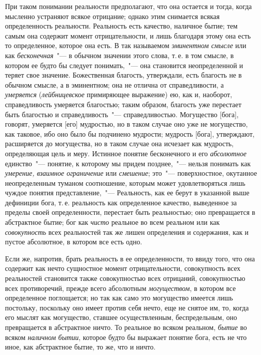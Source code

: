 При таком понимании реальности предполагают, что
она остается и тогда, когда мысленно устраняют всякое
отрицание; однако этим снимается всякая определенность
реальности. Реальность есть качество, наличное
бытие; тем самым она содержит момент отрицательности,
и лишь благодаря этому она есть то определенное, которое
она есть. В так называемом \emph{эминентном смысле}\endnotemark{}
или как \emph{бесконечная}~"--- в обычном значении этого слова,
т.\,е. в том смысле, в котором ее будто бы следует понимать,~"---
она становится неопределенной и теряет свое
значение. Божественная благость, утверждали, есть благость
не в обычном смысле, а в эминентном; она не отлична
от справедливости, а \emph{умеряется} (\emph{лейбницевское}
примиряющее выражение) ею, как и, наоборот, справедливость
умеряется благостью; таким образом, благость
уже перестает быть благостью и справедливость~"--- справедливостью.
Могущество [бога], говорят, умеряется [его]
мудростью, но в таком случае оно уже не могущество,
как таковое, ибо оно было бы подчинено мудрости; мудрость
[бога], утверждают, расширяется до могущества, но
в таком случае она исчезает как мудрость, определяющая
цель и меру. Истинное понятие бесконечного и его
\emph{абсолютное} единство~"--- понятие, к которому мы придем
позднее,~"--- нельзя понимать как \emph{умерение, взаимное ограничение}
или \emph{смешение}; это~"--- поверхностное, окутанное
неопределенным туманом соотношение, которым может
удовлетворяться лишь чуждое понятия представление,~"---
Реальность, как ее берут в указанной выше дефиниции
бога, т.\,е. реальность как определенное качество, выведенное
за пределы своей определенности, перестает быть реальностью;
оно превращается в абстрактное бытие; бог как
\emph{чисто} реальное во всем реальном или как \emph{совокупность}
всех реальностей так же лишен определения и содержания,
как и пустое абсолютное, в котором все есть одно.


Если же, напротив, брать реальность в ее определенности,
то ввиду того, что она содержит как нечто сущностное
момент отрицательности, совокупность всех реальностей
становится также совокупностью всех отрицаний,
совокупностью всех противоречий, прежде всего
абсолютным \emph{могуществом}, в котором все определенное
поглощается; но так как само это могущество имеется
лишь постольку, поскольку оно имеет против себя нечто,
еще не снятое им, то, когда его мыслят как могущество,
ставшее осуществленным, беспредельным, оно превращается
в абстрактное ничто. То реальное во всяком реальном,
\emph{бытие} во всяком \emph{наличном бытии}, которое будто
бы выражает понятие бога, есть не что иное, как абстрактное
бытие, то же, что и ничто.

